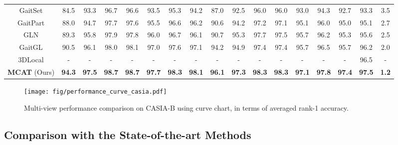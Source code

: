 \documentclass[journal]{IEEEtran}
\begin{document}
\begin{table*}[t]
\begin{center}
\begin{tabular}{|c| c c c c c c c c c c c c c c |c|c|}
GaitSet \cite{chao2021gaitset} & 84.5 & 93.3 & 96.7 & 96.6 & 93.5 & 95.3 & 94.2 & 87.0 & 92.5 & 96.0 & 96.0 & 93.0 & 94.3 & 92.7 & 93.3 & 3.5 \\
GaitPart \cite{fan2020gaitpart} & 88.0 & 94.7 & 97.7 & 97.6 & 95.5 & 96.6 & 96.2 & 90.6 & 94.2 & 97.2 & 97.1 & 95.1 & 96.0 & 95.0 & 95.1 & 2.7 \\
GLN \cite{hou2020gait} & 89.3 & 95.8 & 97.9 & 97.8 & 96.0 & 96.7 & 96.1 & 90.7 & 95.3 & 97.7 & 97.5 & 95.7 & 96.2 & 95.3 & 95.6 & 2.5 \\
GaitGL \cite{GaitGL} & 90.5 & 96.1 & 98.0 & 98.1 & 97.0 & 97.6 & 97.1 & 94.2 & 94.9 & 97.4 & 97.4 & 95.7 & 96.5 & 95.7 & 96.2 & 2.0 \\
3DLocal \cite{local3D} & - & - & - & - & - & - & - & - & - & - & - & - & - & - & 96.5 & - \\
\textbf{MCAT} (Ours) & \textbf{94.3} &\textbf{ 97.5} & \textbf{98.7} & \textbf{98.7} & \textbf{97.7} & \textbf{98.3} & \textbf{98.1} & \textbf{96.1} & \textbf{97.3} & \textbf{98.3} & \textbf{98.3} & \textbf{97.1} & \textbf{97.8} & \textbf{97.4} & \textbf{97.5} & \textbf{1.2} \\\hline
\end{tabular}
\label{tab:ou-mvlp}
\end{center}
\end{table*}

\begin{figure}[t]
    \centering
    \texttt{[image: fig/performance\_curve\_casia.pdf]}
    \caption{Multi-view performance comparison on CASIA-B using curve chart, in terms of averaged rank-1 accuracy.}
    \label{fig:casia-b-curve}
\end{figure}

\subsection{Comparison with the State-of-the-art Methods}
\end{document}
